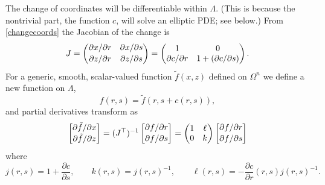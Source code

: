 \documentclass[letterpaper,final,12pt,reqno]{amsart}
\begin{document}
The change of coordinates will be differentiable within $\Lambda$.  (This is because the nontrivial part, the function $c$, will solve an elliptic PDE; see below.)  From \eqref{changecoords} the Jacobian of the change is
\begin{equation}
J = \begin{pmatrix} \partial x / \partial r & \partial x / \partial s \\ {\large\strut} \partial z / \partial r & \partial z / \partial s \end{pmatrix} = \begin{pmatrix} 1 & 0 \\ \partial c/\partial r & 1+(\partial c/\partial s) \end{pmatrix}. \label{jacchange}
\end{equation}
For a generic, smooth, scalar-valued function $\tilde f(x,z)$ defined on $\Omega^n$ we define a new function on $\Lambda$,
    $$f(r,s) = \tilde f(r,s+c(r,s)),$$
and partial derivatives transform as
\begin{equation}
\begin{bmatrix} \partial \tilde f / \partial x \\ {\large\strut} \partial \tilde f / \partial z\end{bmatrix} = (J^\top)^{-1} \begin{bmatrix} \partial f / \partial r \\ {\large\strut} \partial f / \partial s\end{bmatrix} = \begin{pmatrix} 1 & \ell \\ 0 & k \end{pmatrix} \begin{bmatrix} \partial f / \partial r \\ {\large\strut} \partial f / \partial s\end{bmatrix} \label{changederivatives}
\end{equation}
where
\begin{equation}
j(r,s) = 1+\frac{\partial c}{\partial s}, \qquad k(r,s) = j(r,s)^{-1}, \qquad \ell(r,s) = - \frac{\partial c}{\partial r}(r,s) j(r,s)^{-1}. \label{definejkl}
\end{equation}
\end{document}
